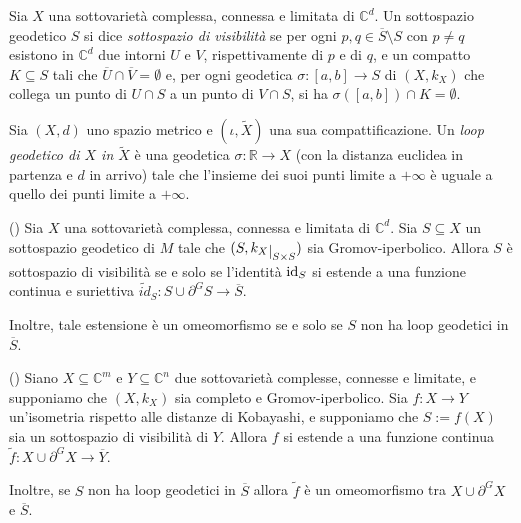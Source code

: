 \begin{defn}
    Sia $X$ una sottovarietà complessa, connessa e limitata di $\mathbb{C}^d$. Un sottospazio geodetico $S$ si dice \textit{sottospazio di visibilità} se per ogni $p,q\in\overline{S}\setminus S$ con $p\not=q$ esistono in $\mathbb{C}^d$ due intorni $U$ e $V$, rispettivamente di $p$ e di $q$, e un compatto $K\subseteq S$ tali che $\overline{U}\cap\overline{V}=\emptyset$ e, per ogni geodetica $\sigma:[a,b]\longrightarrow S$ di $(X,k_X)$ che collega un punto di $U\cap S$ a un punto di $V\cap S$, si ha $\sigma([a,b])\cap K=\emptyset$.
\end{defn}

\begin{defn}
    Sia $(X,d)$ uno spazio metrico e $(\iota,\tilde{X})$ una sua compattificazione. Un \textit{loop geodetico di $X$ in $\tilde{X}$} è una geodetica $\sigma:\mathbb{R}\longrightarrow X$ (con la distanza euclidea in partenza e $d$ in arrivo) tale che l'insieme dei suoi punti limite a $+\infty$ è uguale a quello dei punti limite a $+\infty$.
\end{defn}

\begin{thm}
    (\cite[Theorem 1.4]{CMS}) Sia $X$ una sottovarietà complessa, connessa e limitata di $\mathbb{C}^d$. Sia $S\subseteq X$ un sottospazio geodetico di $M$ tale che $(S,k_X\restrict{S\times S})$ sia Gromov-iperbolico. Allora $S$ è sottospazio di visibilità se e solo se l'identità $\operatorname{id}_S$ si estende a una funzione continua e suriettiva $\tilde{id}_S:S\cup\partial^GS\longrightarrow\overline{S}$.

    Inoltre, tale estensione è un omeomorfismo se e solo se $S$ non ha loop geodetici in $\overline{S}$.
\end{thm}

\begin{thm}
    (\cite[Theorem 1.5]{CMS}) Siano $X\subseteq\mathbb{C}^m$ e $Y\subseteq\mathbb{C}^n$ due sottovarietà complesse, connesse e limitate, e supponiamo che $(X,k_X)$ sia completo e Gromov-iperbolico. Sia $f:X\longrightarrow Y$ un'isometria rispetto alle distanze di Kobayashi, e supponiamo che $S:=f(X)$ sia un sottospazio di visibilità di $Y$. Allora $f$ si estende a una funzione continua $\tilde{f}:X\cup\partial^GX\longrightarrow\overline{Y}$.

    Inoltre, se $S$ non ha loop geodetici in $\overline{S}$ allora $\tilde{f}$ è un omeomorfismo tra $X\cup\partial^GX$ e $\overline{S}$.
\end{thm}